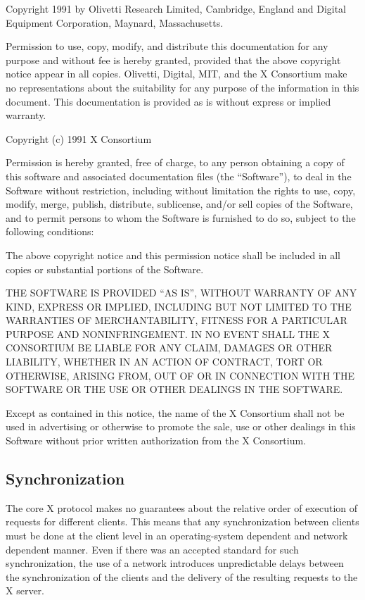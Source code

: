 Copyright 1991 by Olivetti Research Limited, Cambridge, England and
Digital Equipment Corporation, Maynard, Massachusetts.

{\small Permission to use, copy, modify, and distribute this documentation
for any purpose and without fee is hereby granted, provided that the above
copyright notice appear in all copies. Olivetti, Digital, MIT, and the
X Consortium
make no representations about the suitability for any purpose of the
information in this document. This documentation is provided as is without
express or implied warranty.}

Copyright (c) 1991 X Consortium

{\small Permission is hereby granted, free of charge, to any person obtaining a copy
of this software and associated documentation files (the ``Software''), to deal
in the Software without restriction, including without limitation the rights
to use, copy, modify, merge, publish, distribute, sublicense, and/or sell
copies of the Software, and to permit persons to whom the Software is
furnished to do so, subject to the following conditions:

The above copyright notice and this permission notice shall be included in
all copies or substantial portions of the Software.

THE SOFTWARE IS PROVIDED ``AS IS'', WITHOUT WARRANTY OF ANY KIND, EXPRESS OR
IMPLIED, INCLUDING BUT NOT LIMITED TO THE WARRANTIES OF MERCHANTABILITY,
FITNESS FOR A PARTICULAR PURPOSE AND NONINFRINGEMENT.  IN NO EVENT SHALL THE
X CONSORTIUM BE LIABLE FOR ANY CLAIM, DAMAGES OR OTHER LIABILITY, WHETHER IN
AN ACTION OF CONTRACT, TORT OR OTHERWISE, ARISING FROM, OUT OF OR IN
CONNECTION WITH THE SOFTWARE OR THE USE OR OTHER DEALINGS IN THE SOFTWARE.

Except as contained in this notice, the name of the X Consortium shall not be
used in advertising or otherwise to promote the sale, use or other dealings
in this Software without prior written authorization from the X Consortium.}
\eject

\subsection*{Synchronization}

The core X protocol makes no guarantees about the relative order of execution
of requests for different clients. This means that any synchronization between
clients must be done at the client level in an operating-system dependent and
network dependent manner. Even if there was an accepted standard for such
synchronization, the use of a network introduces unpredictable delays between
the synchronization of the clients and the delivery of the resulting requests
to the X server.

